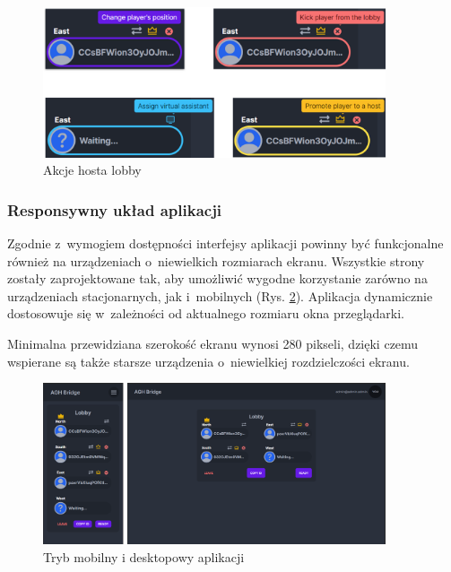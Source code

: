 \begin{figure}[h!]
  \centering
  \includegraphics[width=0.9\textwidth]{img/widoki/host_actions.png}
  \caption{Akcje hosta lobby}
  \label{fig:host_actions_ui}
\end{figure}

\FloatBarrier

\subsubsection{Responsywny układ aplikacji}

Zgodnie z~wymogiem dostępności interfejsy aplikacji powinny
być funkcjonalne również na urządzeniach o~niewielkich
rozmiarach ekranu. Wszystkie strony zostały zaprojektowane
tak, aby umożliwić wygodne korzystanie zarówno na urządzeniach
stacjonarnych, jak i~mobilnych (Rys. \ref{fig:responsive_ui}). Aplikacja dynamicznie
dostosowuje się w~zależności od aktualnego rozmiaru okna
przeglądarki.

Minimalna przewidziana
szerokość ekranu wynosi 280 pikseli, dzięki czemu wspierane
są także starsze urządzenia o~niewielkiej rozdzielczości
ekranu.

\begin{figure}[h!]
  \centering
  \includegraphics[width=0.9\textwidth]{img/widoki/desktop_mobile.png}
  \caption{Tryb mobilny i desktopowy aplikacji}
  \label{fig:responsive_ui}
\end{figure}

